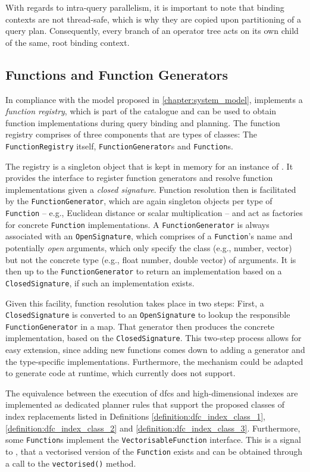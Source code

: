With regards to intra-query parallelism, it is important to note that binding contexts are not thread-safe, which is why they are copied upon partitioning of a query plan. Consequently, every branch of an operator tree acts on its own child of the same, root binding context.

\subsection{Functions and Function Generators}

In compliance with the model proposed in \cref{chapter:system_model}, \cottontail{} implements a \emph{function registry}, which is part of the catalogue and can be used to obtain function implementations during query binding and planning. The function registry comprises of three components that are types of classes: The \texttt{FunctionRegistry} itself, \texttt{FunctionGenerator}s and \texttt{Function}s.

The registry is a singleton object that is kept in memory for an instance of \cottontail{}. It provides the interface to register function generators and resolve function implementations given a \emph{closed signature}. Function resolution then is facilitated by the \texttt{FunctionGenerator}, which are again singleton objects per type of \texttt{Function} -- e.g., Euclidean distance or scalar multiplication -- and act as factories for concrete \texttt{Function} implementations. A \texttt{FunctionGenerator} is always associated with an \texttt{OpenSignature}, which comprises of a \texttt{Function}'s name and potentially \emph{open} arguments, which only specify the class (e.g., number, vector) but not the concrete type (e.g., float number, double vector) of arguments. It is then up to the \texttt{FunctionGenerator} to return an implementation based on a \texttt{ClosedSignature}, if such an implementation exists.

Given this facility, function resolution takes place in two steps: First, a \texttt{ClosedSignature} is converted to an \texttt{OpenSignature} to lookup the responsible \texttt{FunctionGenerator} in a map. That generator then produces the concrete implementation, based on the \texttt{ClosedSignature}. This two-step process allows for easy extension, since adding new functions comes down to adding a generator and the type-specific implementations. Furthermore, the mechanism could be adapted to generate code at runtime, which \cottontail{} currently does not support.

The equivalence between the execution of \acrshort{dfc}s and high-dimensional indexes are implemented as dedicated planner rules that support the proposed classes of index replacements listed in Definitions \ref{definition:dfc_index_class_1}, \ref{definition:dfc_index_class_2} and \ref{definition:dfc_index_class_3}. Furthermore, some \texttt{Function}s implement the \texttt{VectorisableFunction} interface. This is a signal to \cottontail{}, that a vectorised version of the \texttt{Function} exists and can be obtained through a call to the \texttt{vectorised()} method.

